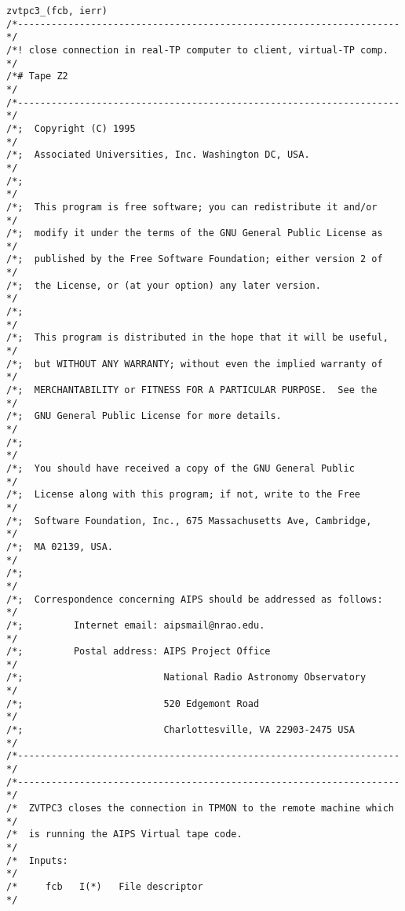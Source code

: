 \begin{center}
\begin{verbatim}
zvtpc3_(fcb, ierr)
/*--------------------------------------------------------------------*/
/*! close connection in real-TP computer to client, virtual-TP comp.  */
/*# Tape Z2                                                           */
/*--------------------------------------------------------------------*/
/*;  Copyright (C) 1995                                               */
/*;  Associated Universities, Inc. Washington DC, USA.                */
/*;                                                                   */
/*;  This program is free software; you can redistribute it and/or    */
/*;  modify it under the terms of the GNU General Public License as   */
/*;  published by the Free Software Foundation; either version 2 of   */
/*;  the License, or (at your option) any later version.              */
/*;                                                                   */
/*;  This program is distributed in the hope that it will be useful,  */
/*;  but WITHOUT ANY WARRANTY; without even the implied warranty of   */
/*;  MERCHANTABILITY or FITNESS FOR A PARTICULAR PURPOSE.  See the    */
/*;  GNU General Public License for more details.                     */
/*;                                                                   */
/*;  You should have received a copy of the GNU General Public        */
/*;  License along with this program; if not, write to the Free       */
/*;  Software Foundation, Inc., 675 Massachusetts Ave, Cambridge,     */
/*;  MA 02139, USA.                                                   */
/*;                                                                   */
/*;  Correspondence concerning AIPS should be addressed as follows:   */
/*;         Internet email: aipsmail@nrao.edu.                        */
/*;         Postal address: AIPS Project Office                       */
/*;                         National Radio Astronomy Observatory      */
/*;                         520 Edgemont Road                         */
/*;                         Charlottesville, VA 22903-2475 USA        */
/*--------------------------------------------------------------------*/
/*--------------------------------------------------------------------*/
/*  ZVTPC3 closes the connection in TPMON to the remote machine which */
/*  is running the AIPS Virtual tape code.                            */
/*  Inputs:                                                           */
/*     fcb   I(*)   File descriptor                                   */

\end{verbatim}
\end{center}
